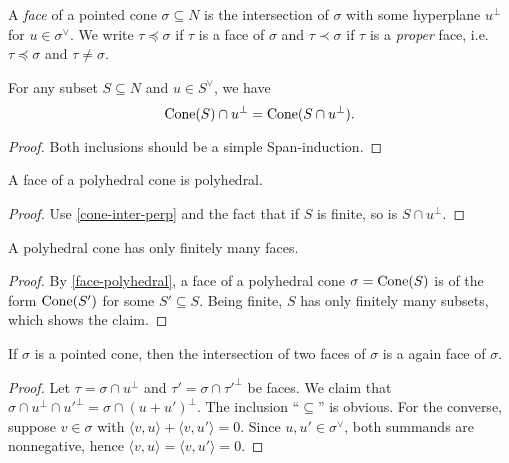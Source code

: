 \begin{definition}
  \label{face}
  \leanok
  A \emph{face} of a pointed cone \( \sigma \subseteq N \) is the
  intersection of \( \sigma \) with some hyperplane \( u^{\perp} \)
  for \( u \in \sigma^{\vee} \). We write \( \tau \preceq \sigma \) if
  \( \tau \) is a face of \( \sigma \) and \( \tau \prec \sigma \) if
  \( \tau \) is a \emph{proper} face, i.e. \( \tau \preceq \sigma \)
  and \( \tau \neq \sigma \).
\end{definition}

\begin{proposition}
  \label{cone-inter-perp}
  \lean{}
  \leanok
  For any subset \( S \subseteq N \) and \( u \in S^{\vee} \), we have
  \[
      \operatorname{Cone}(S) \cap u^{\perp} = \operatorname{Cone}(S \cap u^{\perp}).
  \]
\end{proposition}
\begin{proof}
    Both inclusions should be a simple Span-induction.
\end{proof}

\begin{lemma}
  \label{face-polyhedral}
  \leanok
  A face of a polyhedral cone is polyhedral.
\end{lemma}
\begin{proof}
  \leanok
  Use \ref{cone-inter-perp} and the fact that if \( S \) is finite,
  so is \( S \cap u^{\perp} \).
\end{proof}



\begin{lemma}
  \label{faces-polyhedral-cone-finite}
  \lean{}
  \leanok
  A polyhedral cone has only finitely many faces.
\end{lemma}
\begin{proof}
  \uses{}
  \leanok
  By \ref{face-polyhedral}, a face of a polyhedral cone \( \sigma =
  \operatorname{Cone}(S) \) is of the form \( \operatorname{Cone}(S') \) for some \( S' \subseteq
  S \). Being finite, \( S \) has only finitely many subsets, which
  shows the claim.
\end{proof}


\begin{lemma}
  \label{face-intersection}
  \leanok
  If \( \sigma \) is a pointed cone, then the intersection of two
  faces of \( \sigma \) is a again face of \( \sigma \).
\end{lemma}
\begin{proof}
  \uses{}
  \leanok
  Let \( \tau = \sigma \cap u^{\perp} \) and \( \tau' = \sigma \cap
  \tau'^{\perp} \) be faces. We claim that \( \sigma \cap u^{\perp}
  \cap u'^{\perp} = \sigma \cap (u + u')^{\perp} \). The inclusion
  ``\( \subseteq \)'' is obvious. For the converse, suppose \( v \in
  \sigma \) with \( \langle v, u \rangle + \langle v, u' \rangle = 0
  \). Since \( u, u' \in \sigma^{\vee} \), both summands are
  nonnegative, hence \( \langle v, u \rangle = \langle v, u' \rangle =
  0 \).
\end{proof}

